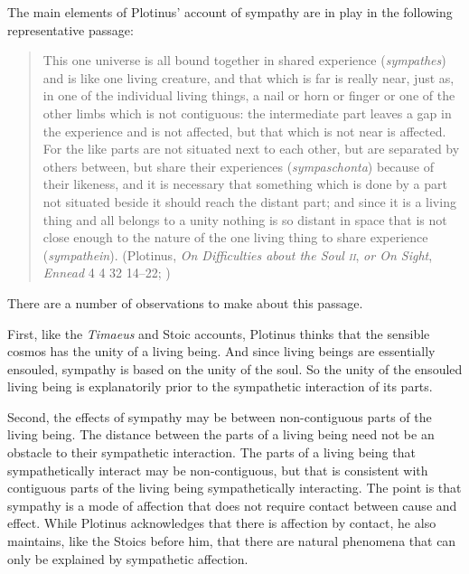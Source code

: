 The main elements of Plotinus' account of sympathy are in play in the following representative passage:
\begin{quote}
	This one universe is all bound together in shared experience (\emph{sympathes}) and is like one living creature, and that which is far is really near, just as, in one of the individual living things, a nail or horn or finger or one of the other limbs which is not contiguous: the intermediate part leaves a gap in the experience and is not affected, but that which is not near is affected. For the like parts are not situated next to each other, but are separated by others between, but share their experiences (\emph{sympaschonta}) because of their likeness, and it is necessary that something which is done by a part not situated beside it should reach the distant part; and since it is a living thing and all belongs to a unity nothing is so distant in space that is not close enough to the nature of the one living thing to share experience (\emph{sympathein}). (Plotinus, \emph{On Difficulties about the Soul \textsc{ii}}, \emph{or On Sight}, \emph{Ennead} 4 4 32 14--22; \citealt[235--7]{Armstrong:1984aa})
\end{quote}
There are a number of observations to make about this passage.

First, like the \emph{Timaeus} and Stoic accounts, Plotinus thinks that the sensible cosmos has the unity of a living being. And since living beings are essentially ensouled, sympathy is based on the unity of the soul. So the unity of the ensouled living being is explanatorily prior to the sympathetic interaction of its parts.

Second, the effects of sympathy may be between non-contiguous parts of the living being. The distance between the parts of a living being need not be an obstacle to their sympathetic interaction. The parts of a living being that sympathetically interact may be non-contiguous, but that is consistent with contiguous parts of the living being sympathetically interacting. The point is that sympathy is a mode of affection that does not require contact between cause and effect. While Plotinus acknowledges that there is affection by contact, he also maintains, like the Stoics before him, that there are natural phenomena that can only be explained by sympathetic affection.

